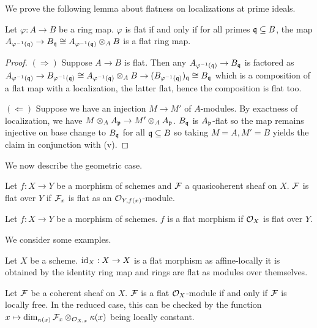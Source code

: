 We prove the following lemma about flatness on localizations at prime ideals. 
\begin{lemma}\label{lem: flatness on stalks}
    Let $\varphi:A\to B$ be a ring map. $\varphi$ is flat if and only if for all primes $\mathfrak{q}\subseteq B$, the map $A_{\varphi^{-1}(\mathfrak{q})}\to B_{\mathfrak{q}}\cong A_{\varphi^{-1}(\mathfrak{q})}\otimes_{A}B$ is a flat ring map. 
\end{lemma}
\begin{proof}
    $(\Rightarrow)$ Suppose $A\to B$ is flat. Then any $A_{\varphi^{-1}(\mathfrak{q})}\to B_{\mathfrak{q}}$ is factored as $A_{\varphi^{-1}(\mathfrak{q})}\to B_{\varphi^{-1}(\mathfrak{q})}\cong A_{\varphi^{-1}(\mathfrak{q})}\otimes_{A}B\to(B_{\varphi^{-1}(\mathfrak{q})})_{\mathfrak{q}}\cong B_{\mathfrak{q}}$ which is a composition of a flat map with a localization, the latter flat, hence the composition is flat too. 

    $(\Leftarrow)$ Suppose we have an injection $M\to M'$ of $A$-modules. By exactness of localization, we have $M\otimes_{A}A_{\mathfrak{p}}\to M'\otimes_{A}A_{\mathfrak{p}}$. $B_{\mathfrak{q}}$ is $A_{\mathfrak{p}}$-flat so the map remains injective on base change to $B_{\mathfrak{q}}$ for all $\mathfrak{q}\subseteq B$ so taking $M=A,M'=B$ yields the claim in conjunction with  (v). 
\end{proof}
We now describe the geometric case. 
\begin{definition}\label{def: flat sheaves}
    Let $f:X\to Y$ be a morphism of schemes and $\mathcal{F}$ a quasicoherent sheaf on $X$. $\mathcal{F}$ is flat over $Y$ if $\mathcal{F}_{x}$ is flat as an $\mathcal{O}_{Y,f(x)}$-module. 
\end{definition}
\begin{definition}\label{def: flat morphism}
    Let $f:X\to Y$ be a morphism of schemes. $f$ is a flat morphism if $\mathcal{O}_{X}$ is flat over $Y$. 
\end{definition}
We consider some examples. 
\begin{example}
    Let $X$ be a scheme. $\mathrm{id}_{X}:X\to X$ is a flat morphism as affine-locally it is obtained by the identity ring map and rings are flat as modules over themselves. 
\end{example}
\begin{example}
    Let $\mathcal{F}$ be a coherent sheaf on $X$. $\mathcal{F}$ is a flat $\mathcal{O}_{X}$-module if and only if $\mathcal{F}$ is locally free. In the reduced case, this can be checked by the function $x\mapsto\dim_{\kappa(x)}\mathcal{F}_{x}\otimes_{\mathcal{O}_{X,x}}\kappa(x)$ being locally constant. 
\end{example}
